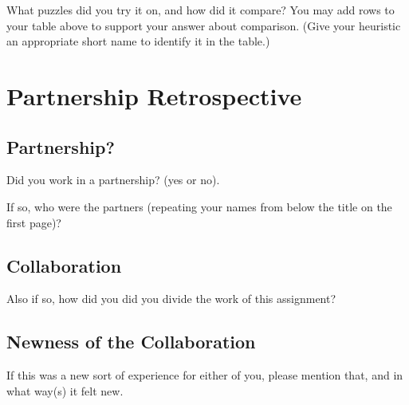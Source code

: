 \documentclass{article}
\begin{document}
What puzzles did you try it on, and how did it compare?
You may add rows to your table above to support your answer about comparison.
(Give your heuristic an appropriate short name to identify it in the table.)

\newpage
\section{Partnership Retrospective}

\subsection{Partnership?}
Did you work in a partnership? (yes or no).

If so, who were the partners (repeating your names from below the title on the first page)?

\subsection{Collaboration}
Also if so, how did you did you divide the work of this assignment?

\subsection{Newness of the Collaboration}
If this was a new sort of experience for either of you, please mention that,
and in what way(s) it felt new.
\end{document}
